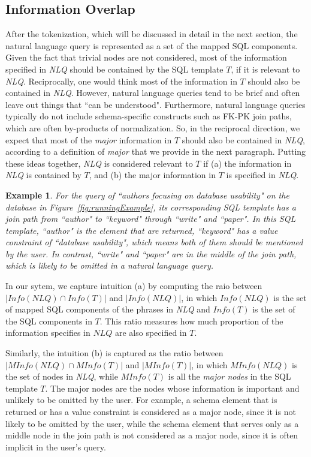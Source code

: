 \documentclass{vldb}
\newtheorem{example}{Example}
\begin{document}
\subsection{Information Overlap}
\label{subsec:overlap}
After the tokenization, which will be discussed in detail in the next section, the natural language query is represented as a set of the mapped SQL components.  Given the fact that trivial nodes are not considered, most of the information specified in \emph{NLQ} should be contained by the SQL template $T$, if it is relevant to \emph{NLQ}.  Reciprocally, one would think most of the information in $T$ should also be contained in \emph{NLQ}.  However, natural language queries tend to be brief and often leave out things that ``can be understood".  Furthermore, natural language queries typically do not include schema-specific constructs such as FK-PK join paths, which are often by-products of normalization.  So, in the reciprocal direction, we expect that most of the {\em major} information in $T$ should also be contained in \emph{NLQ}, according to a definition of {\em major} that we provide in the next paragraph.  Putting these ideas together, \emph{NLQ} is considered relevant to $T$ if (a) the information in \emph{NLQ} is contained by $T$, and (b) the major information in $T$ is specified in \emph{NLQ}.  
\begin{example}
For the query of ``authors focusing on database usability" on the database in Figure~\ref{fig:runningExample}, its corresponding SQL template has a join path from ``author" to ``keyword" through ``write" and ``paper".  In this SQL template, ``author" is the element that are returned, ``keyword" has a value constraint of ``database usability", which means both of them should be mentioned by the user.  In contrast, ``write" and ``paper" are in the middle of the join path, which is likely to be omitted in a natural language query. 
\end{example}

In our sytem, we capture intuition (a) by computing the raio between $\mathit{|Info(NLQ) \cap Info(T)|}$ and $\mathit{|Info(NLQ)|}$, in which $\mathit{Info(NLQ)}$ is the set of mapped SQL components of the phrases in \emph{NLQ} and $\mathit{Info(T)}$ is the set of the SQL components in $T$.  This ratio measures how much proportion of the information specifies in $NLQ$ are also specified in $T$.  

Similarly, the intuition (b) is captured as the ratio between $\mathit{|MInfo(NLQ) \cap MInfo(T)|}$ and $\mathit{|MInfo(T)|}$, in which $\mathit{MInfo(NLQ)}$ is the set of nodes in \emph{NLQ}, while $\mathit{MInfo(T)}$ is all the \emph{major nodes} in the SQL template $T$.  The major nodes are the nodes whose information is important and unlikely to be omitted by the user.  For example, a schema element that is returned or has a value constraint is considered as a major node, since it is not likely to be omitted by the user, while the schema element that serves only as a middle node in the join path is not considered as  a major node, since it is often implicit in the user's query.  
\end{document}
